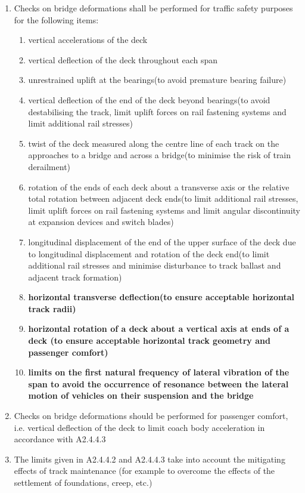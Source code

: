 \begin{appendices}
\begin{enumerate}
	\item Checks on bridge deformations shall be performed for traffic safety purposes for the following items:
	\begin{enumerate}[-]
		\item vertical accelerations of the deck
		\item vertical deflection of the deck throughout each span
		\item unrestrained uplift at the bearings(to avoid premature bearing failure)
		\item vertical deflection of the end of the deck beyond bearings(to avoid destabilising the track, limit uplift forces on rail fastening systems and limit additional rail stresses) 
		\item twist of the deck measured along the centre line of each track on the approaches to a bridge and across a bridge(to minimise the risk of train derailment)
		\item rotation of the ends of each deck about a transverse axis or the relative total rotation between adjacent deck ends(to limit additional rail stresses, limit uplift forces on rail fastening systems and limit angular discontinuity at expansion devices and switch blades)
		\item longitudinal displacement of the end of the upper surface of the deck due to longitudinal displacement and rotation of the deck end(to limit additional rail stresses and minimise disturbance to track ballast and adjacent track formation)
		\item \textbf{horizontal transverse deflection(to ensure acceptable horizontal track radii)}
		\item \textbf{horizontal rotation of a deck about a vertical axis at ends of a deck (to ensure acceptable horizontal track geometry and passenger comfort)}
		\item \textbf{limits on the first natural frequency of lateral vibration of the span to avoid the occurrence of resonance between the lateral motion of vehicles on their suspension and the bridge}
	\end{enumerate}
	\item Checks on bridge deformations should be performed for passenger comfort, i.e. vertical deflection of the deck to limit coach body acceleration in accordance with A2.4.4.3\citet{EC0}
	\item The limits given in A2.4.4.2 and A2.4.4.3\citet{EC0} take into account the mitigating effects of track maintenance (for example to overcome the effects of the settlement of foundations, creep, etc.) 
\end{enumerate}



\end{appendices}
